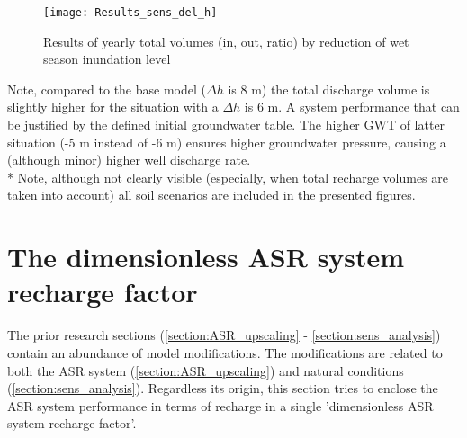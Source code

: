 \begin{figure}[H]
 \centering
 \texttt{[image: Results\_sens\_del\_h]}
 \captionsetup{justification=centering} 
 \caption{Results of yearly total volumes (in, out, ratio) by reduction of wet season inundation level}
 \label{fig:Results_sens_del_h}
\end{figure}

Note, compared to the base model ($\Delta h$ is 8 m) the total discharge volume is slightly higher for the situation with a $\Delta h$ is 6 m. A system performance that can be justified by the defined initial groundwater table. The higher GWT of latter situation (-5 m instead of -6 m) ensures higher groundwater pressure, causing a (although minor) higher well discharge rate. \\


* Note, although not clearly visible (especially, when total recharge volumes are taken into account) all soil scenarios are included in the presented figures.  \\
 
%
%
%

\section{The dimensionless ASR system recharge factor}
\label{section:dim_fac}
The prior research sections (\ref{section:ASR_upscaling} - \ref{section:sens_analysis}) contain an abundance of model modifications. The modifications are related to both the ASR system (\ref{section:ASR_upscaling}) and natural conditions (\ref{section:sens_analysis}). Regardless its origin, this section tries to enclose the ASR system performance in terms of recharge in a single 'dimensionless ASR system recharge factor'. \\
\bigskip
\bigskip
\bigskip
\bigskip
\bigskip

